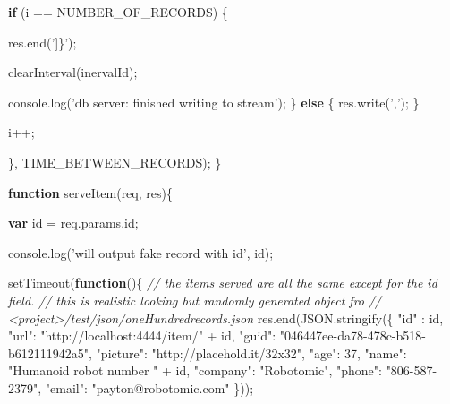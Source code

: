 \documentclass[]{article}
\newenvironment{Shaded}{}{}
\newcommand{\KeywordTok}[1]{\textcolor[rgb]{0.00,0.44,0.13}{\textbf{{#1}}}}
\newcommand{\DecValTok}[1]{\textcolor[rgb]{0.25,0.63,0.44}{{#1}}}
\newcommand{\StringTok}[1]{\textcolor[rgb]{0.25,0.44,0.63}{{#1}}}
\newcommand{\CommentTok}[1]{\textcolor[rgb]{0.38,0.63,0.69}{\textit{{#1}}}}
\newcommand{\OtherTok}[1]{\textcolor[rgb]{0.00,0.44,0.13}{{#1}}}
\newcommand{\FunctionTok}[1]{\textcolor[rgb]{0.02,0.16,0.49}{{#1}}}
\newcommand{\NormalTok}[1]{{#1}}
\begin{document}
\begin{Shaded}
\begin{Highlighting}[]
{      \KeywordTok{if} \NormalTok{(i == NUMBER_OF_RECORDS) \{}

         \OtherTok{res}\NormalTok{.}\FunctionTok{end}\NormalTok{(}\StringTok{']\}'}\NormalTok{);}
         
         \FunctionTok{clearInterval}\NormalTok{(inervalId);}
         
         \OtherTok{console}\NormalTok{.}\FunctionTok{log}\NormalTok{(}\StringTok{'db server: finished writing to stream'}\NormalTok{);}
      \NormalTok{\} }\KeywordTok{else} \NormalTok{\{}
         \OtherTok{res}\NormalTok{.}\FunctionTok{write}\NormalTok{(}\StringTok{','}\NormalTok{);}
      \NormalTok{\}}
      
      \NormalTok{i++;  }

   \NormalTok{\}, TIME_BETWEEN_RECORDS);}
\NormalTok{\}}

\KeywordTok{function} \FunctionTok{serveItem}\NormalTok{(req, res)\{}

   \KeywordTok{var} \NormalTok{id = }\OtherTok{req}\NormalTok{.}\OtherTok{params}\NormalTok{.}\FunctionTok{id}\NormalTok{;}
   
   \OtherTok{console}\NormalTok{.}\FunctionTok{log}\NormalTok{(}\StringTok{'will output fake record with id'}\NormalTok{, id);     }

   \FunctionTok{setTimeout}\NormalTok{(}\KeywordTok{function}\NormalTok{()\{}
      \CommentTok{// the items served are all the same except for the id field.}
      \CommentTok{// this is realistic looking but randomly generated object fro}
      \CommentTok{// <project>/test/json/oneHundredrecords.json   }
      \OtherTok{res}\NormalTok{.}\FunctionTok{end}\NormalTok{(}\OtherTok{JSON}\NormalTok{.}\FunctionTok{stringify}\NormalTok{(\{}
         \StringTok{"id"} \NormalTok{: id,}
         \StringTok{"url"}\NormalTok{: }\StringTok{"http://localhost:4444/item/"} \NormalTok{+ id,      }
         \StringTok{"guid"}\NormalTok{: }\StringTok{"046447ee-da78-478c-b518-b612111942a5"}\NormalTok{,}
         \StringTok{"picture"}\NormalTok{: }\StringTok{"http://placehold.it/32x32"}\NormalTok{,}
         \StringTok{"age"}\NormalTok{: }\DecValTok{37}\NormalTok{,}
         \StringTok{"name"}\NormalTok{: }\StringTok{"Humanoid robot number "} \NormalTok{+ id,}
         \StringTok{"company"}\NormalTok{: }\StringTok{"Robotomic"}\NormalTok{,}
         \StringTok{"phone"}\NormalTok{: }\StringTok{"806-587-2379"}\NormalTok{,}
         \StringTok{"email"}\NormalTok{: }\StringTok{"payton@robotomic.com"}
      \NormalTok{\}));}
            
}
\end{Highlighting}
\end{Shaded}
\end{document}
